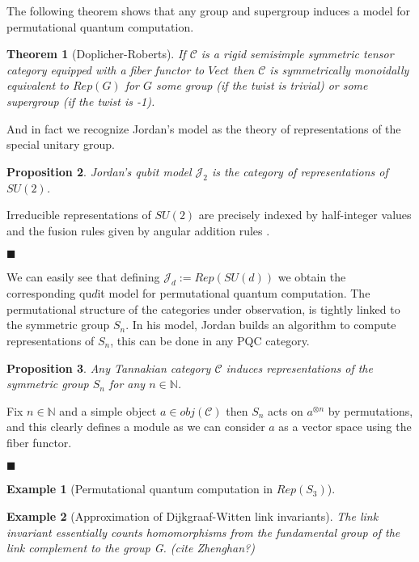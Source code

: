 \documentclass{article}
\newtheorem{example}{Example}
\newtheorem{theorem}{Theorem}
\newtheorem{proposition}[theorem]{Proposition}
\newenvironment{proof}[1][Proof]{\begin{trivlist}
\item[\hskip \labelsep {\bfseries #1}]}{\begin{flushright}$\blacksquare$\end{flushright} \end{trivlist}}
\newcommand{\cat}{\mathcal{C}}
\begin{document}
The following theorem shows that any group and supergroup induces a model for permutational quantum computation.
\begin{theorem}[Doplicher-Roberts]
	If $\mathcal{C}$ is a rigid semisimple symmetric tensor category equipped with a fiber functor to $Vect$ then $\mathcal{C}$ is symmetrically monoidally equivalent to $Rep(G)$ for $G$ some group (if the twist is trivial) or some supergroup (if the twist is -1).
\end{theorem}
And in fact we recognize Jordan's model as the theory of representations of the special unitary group.
\begin{proposition}
	Jordan's qubit model $\mathcal{J}_2$ is the category of representations of $SU(2)$.
\end{proposition}
\begin{proof}
	Irreducible representations of $SU(2)$ are precisely indexed by half-integer values and the fusion rules given by angular addition rules \cite{Woit17}.
\end{proof}
We can easily see that defining $\mathcal{J}_d := Rep(SU(d))$ we obtain the corresponding qu$d$it model for permutational quantum computation. The permutational structure of the categories under observation, is tightly linked to the symmetric group $S_n$. In his model, Jordan builds an algorithm to compute representations of $S_n$, this can be done in any PQC category.
\begin{proposition}
	Any Tannakian category $\cat$ induces representations of the symmetric group $S_n$ for any $n\in \mathbb{N}$.
\end{proposition}
\begin{proof}
	Fix $n \in \mathbb{N}$ and a simple object $a \in obj(\cat)$ then $S_n$ acts on $a^{\otimes n}$ by permutations, and this clearly defines a module as we can consider $a$ as a vector space using the fiber functor.
\end{proof}


\begin{example}[Permutational quantum computation in $Rep(S_3)$]
\end{example}

\begin{example}[Approximation of Dijkgraaf-Witten link invariants]
	The link invariant essentially counts homomorphisms from the fundamental group
	of the link complement to the group G. (cite Zhenghan?)
\end{example}

\end{document}
